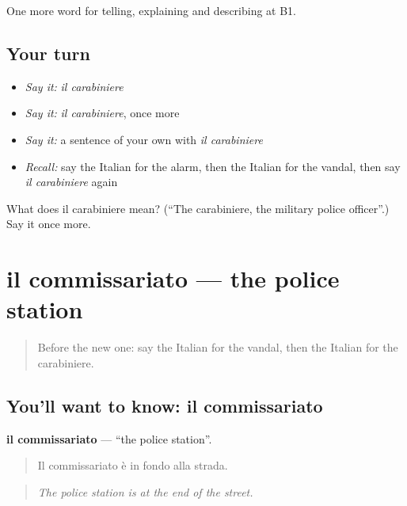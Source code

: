 \begin{grammarlens}[title={What you've built}]
One more word for telling, explaining and describing at B1.
\end{grammarlens}

\subsection*{Your turn}
\begin{itemize}
\raggedright
  \item \emph{Say it:} \emph{il carabiniere}
  \item \emph{Say it:} \emph{il carabiniere}, once more
  \item \emph{Say it:} a sentence of your own with \emph{il carabiniere}
  \item \emph{Recall:} say the Italian for the alarm, then the Italian for the vandal, then say \emph{il carabiniere} again
\end{itemize}

\begin{tcolorbox}[breakable,colback=teal!4,colframe=teal!35!black,title={Before you move on}]
What does il carabiniere mean? (\textquotedblleft{}The carabiniere, the military police officer\textquotedblright{}.) Say it once more.
\end{tcolorbox}
\section[il commissariato]{il commissariato — the police station}

\label{lesson:IT-C294-commissariato}



\begin{quote}
Before the new one: say the Italian for the vandal, then the Italian for the carabiniere.
\end{quote}

\subsection*{You'll want to know: il commissariato}
\textbf{il commissariato} — \textquotedblleft{}the police station\textquotedblright{}.

\begin{quote}
Il commissariato è in fondo alla strada.
\end{quote}

\begin{quote}
\emph{The police station is at the end of the street.}
\end{quote}


